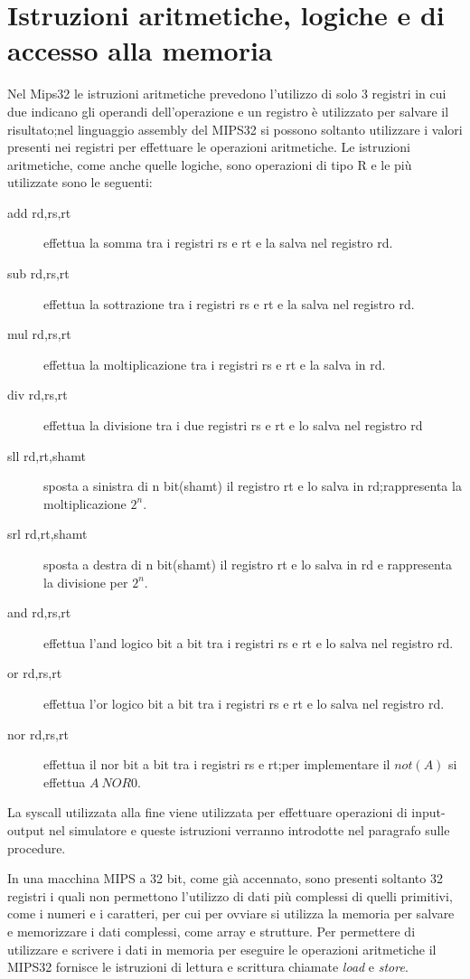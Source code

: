 \section{Istruzioni aritmetiche, logiche e di accesso alla memoria}
Nel Mips32 le istruzioni aritmetiche prevedono l'utilizzo di solo 3 registri
in cui due indicano gli operandi dell'operazione e un registro è utilizzato per
salvare il risultato;nel linguaggio assembly del MIPS32 si possono soltanto utilizzare
i valori presenti nei registri per effettuare le operazioni aritmetiche.
Le istruzioni aritmetiche, come anche quelle logiche, sono operazioni di tipo R
e le più utilizzate sono le seguenti:
\begin{description}
  \item[add rd,rs,rt] effettua la somma tra i registri rs e rt e la salva nel registro rd.
  \item[sub rd,rs,rt] effettua la sottrazione tra i registri rs e rt e la salva nel registro rd.
  \item[mul rd,rs,rt] effettua la moltiplicazione tra i registri rs e rt e la salva in rd.
  \item[div rd,rs,rt] effettua la divisione tra i due registri rs e rt e lo salva nel registro rd
  \item[sll rd,rt,shamt] sposta a sinistra di n bit(shamt) il registro rt e lo salva in rd;rappresenta la moltiplicazione $2 ^ n$.
  \item[srl rd,rt,shamt] sposta a destra di n bit(shamt) il registro rt e lo salva in rd e rappresenta la divisione per $2^n$.
  \item[and rd,rs,rt] effettua l'and logico bit a bit tra i registri rs e rt e lo salva nel registro rd.
  \item[or rd,rs,rt] effettua l'or logico bit a bit tra i registri rs e rt e lo salva nel registro rd.
  \item[nor rd,rs,rt] effettua il nor bit a bit tra i registri rs e rt;per implementare il $not(A)$ si effettua $A \ NOR 0$.
\end{description}


La syscall utilizzata alla fine viene utilizzata per effettuare operazioni di input-
output nel simulatore e queste istruzioni verranno introdotte nel paragrafo sulle procedure.

In una macchina MIPS a 32 bit, come già accennato, sono presenti soltanto 32 registri
i quali non permettono l'utilizzo di dati più complessi di quelli primitivi, come i numeri e i caratteri,
per cui per ovviare si utilizza la memoria per salvare e memorizzare i dati complessi, come array e strutture.
Per permettere di utilizzare e scrivere i dati in memoria per eseguire le operazioni aritmetiche
il MIPS32 fornisce le istruzioni di lettura e scrittura chiamate \emph{load} e \emph{store}.

